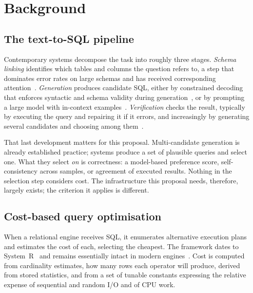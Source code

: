 \documentclass[12pt, a4paper]{article}
\begin{document}
\section{Background}
\label{sec:background}

\subsection{The text-to-SQL pipeline}

Contemporary systems decompose the task into roughly three stages.
\emph{Schema linking} identifies which tables and columns the question
refers to, a step that dominates error rates on large schemas and has
received corresponding attention~\cite{li2023resdsql, talaei2024chess}.
\emph{Generation} produces candidate SQL, either by constrained decoding
that enforces syntactic and schema validity during
generation~\cite{scholak2021picard}, or by prompting a large model with
in-context examples~\cite{pourreza2023dinsql, gao2024dailsql}.
\emph{Verification} checks the result, typically by executing the query
and repairing it if it errors, and increasingly by generating several
candidates and choosing among them~\cite{pourreza2024chase}.

That last development matters for this proposal. Multi-candidate
generation is already established practice; systems produce a set of
plausible queries and select one. What they select \emph{on} is
correctness: a model-based preference score, self-consistency across
samples, or agreement of executed results. Nothing in the selection step
considers cost. The infrastructure this proposal needs, therefore,
largely exists; the criterion it applies is different.

\subsection{Cost-based query optimisation}

When a relational engine receives SQL, it enumerates alternative
execution plans and estimates the cost of each, selecting the cheapest.
The framework dates to System~R~\cite{selinger1979access} and remains
essentially intact in modern engines~\cite{chaudhuri1998overview,
graefe1993query}. Cost is computed from cardinality estimates, how many
rows each operator will produce, derived from stored statistics, and
from a set of tunable constants expressing the relative expense of
sequential and random I/O and of CPU work.
\end{document}
